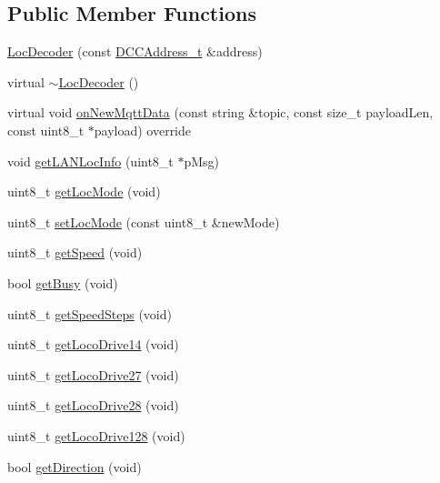 \subsection*{Public Member Functions}
\begin{DoxyCompactItemize}
\item 
\hyperlink{classIoTT_1_1LocDecoder_a9643de201baffeecfe14f26fdd1105e5}{Loc\+Decoder} (const \hyperlink{namespaceIoTT_a31b8cd9473fc447b3fb341b78afa54fe}{D\+C\+C\+Address\+\_\+t} \&address)
\item 
virtual \hyperlink{classIoTT_1_1LocDecoder_aafbfe84b5303dd6155d55aa277e1751f}{$\sim$\+Loc\+Decoder} ()
\item 
virtual void \hyperlink{classIoTT_1_1LocDecoder_a7d2faa51ae31ee25ed63ebaefbda5d78}{on\+New\+Mqtt\+Data} (const string \&topic, const size\+\_\+t payload\+Len, const uint8\+\_\+t $\ast$payload) override
\item 
void \hyperlink{classIoTT_1_1LocDecoder_a395369fe38be49fe123a915562a5e1b5}{get\+L\+A\+N\+Loc\+Info} (uint8\+\_\+t $\ast$p\+Msg)
\item 
uint8\+\_\+t \hyperlink{classIoTT_1_1LocDecoder_afe55555aa98e8bf36748676b81e3c01f}{get\+Loc\+Mode} (void)
\item 
uint8\+\_\+t \hyperlink{classIoTT_1_1LocDecoder_a7ed0dd387ddae6c5634cde59e3fc7966}{set\+Loc\+Mode} (const uint8\+\_\+t \&new\+Mode)
\item 
uint8\+\_\+t \hyperlink{classIoTT_1_1LocDecoder_aaa19e16c24db209d24f30e4698da7f31}{get\+Speed} (void)
\item 
bool \hyperlink{classIoTT_1_1LocDecoder_a16cc784024ab8ba39313f43b3bf9d376}{get\+Busy} (void)
\item 
uint8\+\_\+t \hyperlink{classIoTT_1_1LocDecoder_aa1472d19a65a0e329d2e64ad0acd6764}{get\+Speed\+Steps} (void)
\item 
uint8\+\_\+t \hyperlink{classIoTT_1_1LocDecoder_a5353bd57bf5c0482b636a6b081b66f27}{get\+Loco\+Drive14} (void)
\item 
uint8\+\_\+t \hyperlink{classIoTT_1_1LocDecoder_a9e68771693d3a8b615ac04afe92f442e}{get\+Loco\+Drive27} (void)
\item 
uint8\+\_\+t \hyperlink{classIoTT_1_1LocDecoder_a1c671f2f852d67a43e7d39cb4ce992f9}{get\+Loco\+Drive28} (void)
\item 
uint8\+\_\+t \hyperlink{classIoTT_1_1LocDecoder_abf4a45e2a47e4d719c6ed6ea7f86916c}{get\+Loco\+Drive128} (void)
\item 
bool \hyperlink{classIoTT_1_1LocDecoder_a4b24c7a74f00c744312fa93e50179e04}{get\+Direction} (void)

\end{DoxyCompactItemize}
